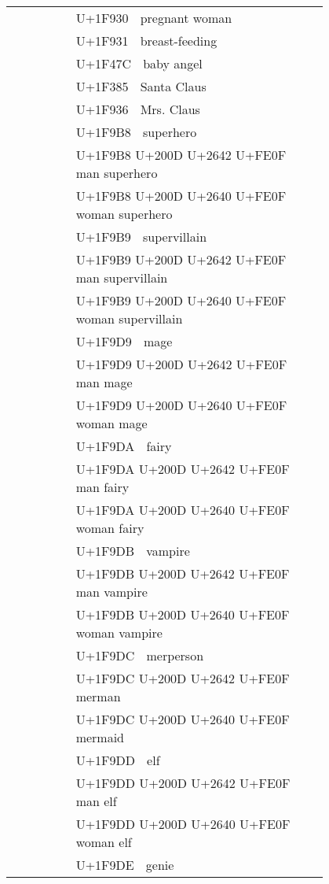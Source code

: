 \documentclass[a4paper,12pt]{ltjarticle}
\newcommand{\fontA}[1]{{\fontspec[RawFeature={mode=harf,+dist,+ccmp}]{Segoe UI Emoji} #1}}
\newcommand{\fontB}[1]{{\fontspec[RawFeature={mode=harf,+dist,+ccmp}]{Noto Color Emoji} #1}}
\begin{document}
\begin{longtable}[c]{ccp{0.8\linewidth}}
\fontA{🤰}&\fontB{🤰}&U+1F930 🤰 pregnant woman\\
\fontA{🤱}&\fontB{🤱}&U+1F931 🤱 breast-feeding\\
\fontA{👼}&\fontB{👼}&U+1F47C 👼 baby angel\\
\fontA{🎅}&\fontB{🎅}&U+1F385 🎅 Santa Claus\\
\fontA{🤶}&\fontB{🤶}&U+1F936 🤶 Mrs. Claus\\
\fontA{🦸}&\fontB{🦸}&U+1F9B8 🦸 superhero\\
\fontA{🦸‍♂️}&\fontB{🦸‍♂️}&U+1F9B8 U+200D U+2642 U+FE0F 🦸‍♂️ man superhero\\
\fontA{🦸‍♀️}&\fontB{🦸‍♀️}&U+1F9B8 U+200D U+2640 U+FE0F 🦸‍♀️ woman superhero\\
\fontA{🦹}&\fontB{🦹}&U+1F9B9 🦹 supervillain\\
\fontA{🦹‍♂️}&\fontB{🦹‍♂️}&U+1F9B9 U+200D U+2642 U+FE0F 🦹‍♂️ man supervillain\\
\fontA{🦹‍♀️}&\fontB{🦹‍♀️}&U+1F9B9 U+200D U+2640 U+FE0F 🦹‍♀️ woman supervillain\\
\fontA{🧙}&\fontB{🧙}&U+1F9D9 🧙 mage\\
\fontA{🧙‍♂️}&\fontB{🧙‍♂️}&U+1F9D9 U+200D U+2642 U+FE0F 🧙‍♂️ man mage\\
\fontA{🧙‍♀️}&\fontB{🧙‍♀️}&U+1F9D9 U+200D U+2640 U+FE0F 🧙‍♀️ woman mage\\
\fontA{🧚}&\fontB{🧚}&U+1F9DA 🧚 fairy\\
\fontA{🧚‍♂️}&\fontB{🧚‍♂️}&U+1F9DA U+200D U+2642 U+FE0F 🧚‍♂️ man fairy\\
\fontA{🧚‍♀️}&\fontB{🧚‍♀️}&U+1F9DA U+200D U+2640 U+FE0F 🧚‍♀️ woman fairy\\
\fontA{🧛}&\fontB{🧛}&U+1F9DB 🧛 vampire\\
\fontA{🧛‍♂️}&\fontB{🧛‍♂️}&U+1F9DB U+200D U+2642 U+FE0F 🧛‍♂️ man vampire\\
\fontA{🧛‍♀️}&\fontB{🧛‍♀️}&U+1F9DB U+200D U+2640 U+FE0F 🧛‍♀️ woman vampire\\
\fontA{🧜}&\fontB{🧜}&U+1F9DC 🧜 merperson\\
\fontA{🧜‍♂️}&\fontB{🧜‍♂️}&U+1F9DC U+200D U+2642 U+FE0F 🧜‍♂️ merman\\
\fontA{🧜‍♀️}&\fontB{🧜‍♀️}&U+1F9DC U+200D U+2640 U+FE0F 🧜‍♀️ mermaid\\
\fontA{🧝}&\fontB{🧝}&U+1F9DD 🧝 elf\\
\fontA{🧝‍♂️}&\fontB{🧝‍♂️}&U+1F9DD U+200D U+2642 U+FE0F 🧝‍♂️ man elf\\
\fontA{🧝‍♀️}&\fontB{🧝‍♀️}&U+1F9DD U+200D U+2640 U+FE0F 🧝‍♀️ woman elf\\
\fontA{🧞}&\fontB{🧞}&U+1F9DE 🧞 genie\\

\end{longtable}
\end{document}
